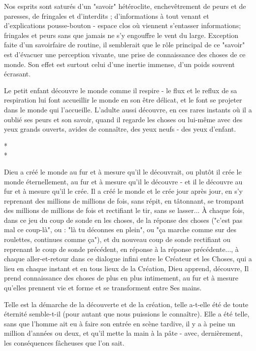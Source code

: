 Nos esprits sont saturés d'un "savoir" hétéroclite, enchevêtrement de peurs et de paresses, de fringales et d'interdits ; d'informations à tout venant et d'explications pousse-bouton - espace clos où viennent s'entasser informations; fringales et peurs sans que jamais ne s'y engouffre le vent du large. Exception faite d'un savoirfaire de routine, il semblerait que le rôle principal de ce "savoir" est d'évacuer une perception vivante, une prise de connaissance des choses de ce monde. Son effet est surtout celui d'une inertie immense, d'un poids souvent écrasant.

Le petit enfant découvre le monde comme il respire - le flux et le reflux de sa respiration lui font accueillir le monde en son être délicat, et le font se projeter dans le monde qui l'accueille. L'adulte aussi découvre, en ces rares instants où il a oublié ses peurs et son savoir, quand il regarde les choses ou lui-même avec des yeux grands ouverts, avides de connaître, des yeux neufs - des yeux d'enfant.

\begin{center}
    * \quad * \\
    *
\end{center}

Dieu a créé le monde au fur et à mesure qu'il le découvrait, ou plutôt il crée le monde éternellement, au fur et à mesure qu'il le découvre - et il le découvre au fur et à mesure qu'il le crée. Il a créé le monde et le crée jour après jour, en s'y reprenant des millions de millions de fois, sans répit, en tâtonnant, se trompant des millions de millions de fois et rectifiant le tir, sans se lasser... À chaque fois, dans ce jeu du coup de sonde en les choses, de la réponse des choses ("c'est pas mal ce coup-là", ou : "là tu déconnes en plein", ou "ça marche comme sur des roulettes, continues comme ça"), et du nouveau coup de sonde rectifiant ou reprenant le coup de sonde précédent, en réponse à la réponse précédente..., à chaque aller-et-retour dans ce dialogue infini entre le Créateur et les Choses, qui a lieu en chaque instant et en tous lieux de la Création, Dieu apprend, découvre, Il prend connaissance des choses de plus en plus intimement, au fur et à mesure qu'elles prennent vie et forme et se transforment entre Ses mains.

Telle est la démarche de la découverte et de la création, telle a-t-elle été de toute éternité semble-t-il (pour autant que nous puissions le connaître). Elle a été telle, sans que l'homme ait eu à faire son entrée en scène tardive, il y a à peine un million d'années ou deux, et qu'il mette la main à la pâte - avec, dernièrement, les conséquences fâcheuses que l'on sait.

